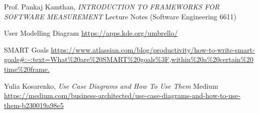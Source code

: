 \documentclass[letterpaper]{report}
\begin{document}
\begin{thebibliography}{. . .}

    Prof. Pankaj Kamthan,
    \textit{INTRODUCTION TO FRAMEWORKS FOR SOFTWARE MEASUREMENT }
    Lecture Notes (Software Engineering 6611)
    
    User Modelling Diagram
    \url{https://apps.kde.org/umbrello/}
    
    SMART Goals
    \url{https://www.atlassian.com/blog/productivity/how-to-write-smart-goals#:~:text=What%20are%20SMART%20goals%3F,within%20a%20certain%20time%20frame.}
    
    Yulia Kosarenko,
    \textit{Use Case Diagrams and How To Use Them}
    Medium
    \url{https://medium.com/business-architected/use-case-diagrams-and-how-to-use-them-b230019a98e5}
    
    \end{thebibliography}
\end{document}
